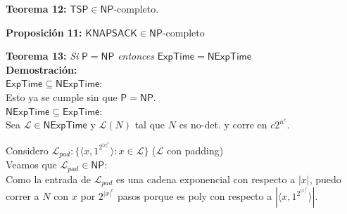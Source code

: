 \documentclass{article}
\begin{document}
\begin{flushleft}
  \textbf{Teorema 12:}
  $\mathsf{TSP} \in \mathsf{NP}$-completo.
\end{flushleft}

\begin{flushleft}
  \textbf{Proposición 11:}
  $\mathsf{KNAPSACK} \in \mathsf{NP}$-completo
\end{flushleft}

\begin{flushleft}
  \textbf{Teorema 13:}
  \textit{Si} $\mathsf{P} = \mathsf{NP}$ \textit{entonces} $\mathsf{ExpTime} = \mathsf{NExpTime}$ \\[0.5em]

  \textbf{\textcolor{Mulberry}{Demostración:}} \\[0.5em]

  \textcolor{Mulberry}{$\mathsf{ExpTime} \subseteq \mathsf{NExpTime}$:} \\[0.5em]

  Esto ya se cumple sin que $\mathsf{P} = \mathsf{NP}$. \\[0.5em]

  \textcolor{Mulberry}{$\mathsf{NExpTime} \subseteq \mathsf{ExpTime}$:} \\[0.5em]

  Sea $\mathcal{L} \in \mathsf{NExpTime}$ y $\mathcal{L}(N)$ tal que $N$ es no-det. y corre en $c2^{n^c}$.

  Considero $\mathcal{L}_{pad} : \{ \langle x, 1^{2^{|x|^c}} \rangle : x \in \mathcal{L}\}$ \qquad 
  \textcolor{OliveGreen}{($\mathcal{L}$ con padding)} \\[0.5em]

  Veamos que $\mathcal{L}_{pad} \in \mathsf{NP}$: \\[0.5em]

  \qquad Como la entrada de $\mathcal{L}_{pad}$ es una cadena exponencial con respecto a $|x|$, puedo 
  correr a $N$ con $x$ por $2^{|x|^c}$ pasos porque es poly con respecto a $|\langle x, 1^{2^{|x|^c}} 
  \rangle|$.
\end{flushleft}
\end{document}
